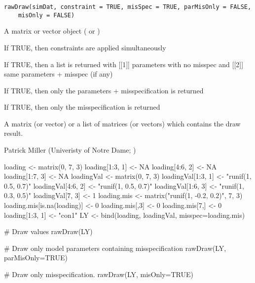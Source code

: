 \documentclass[a4paper]{book}
\begin{document}
%
\begin{Usage}
\begin{verbatim}
rawDraw(simDat, constraint = TRUE, misSpec = TRUE, parMisOnly = FALSE, 
    misOnly = FALSE)
\end{verbatim}
\end{Usage}
%
\begin{Arguments}
\begin{ldescription}
\item[\code{simDat}] 
A matrix or vector object ( or )

\item[\code{constraint}] 
If TRUE, then constraints are applied simultaneously

\item[\code{misSpec}] 
If TRUE, then a list is returned with [[1]] parameters with no misspec and [[2]] same parameters + misspec (if any)

\item[\code{parMisOnly}] 
If TRUE, then only the parameters + misspecification is returned

\item[\code{misOnly}] 
If TRUE, then only the misspecification is returned

\end{ldescription}
\end{Arguments}
%
\begin{Value}
A matrix (or vector) or a list of matrices (or vectors) which contains the draw result.
\end{Value}
%
\begin{Author}\relax
Patrick Miller (Univeristy of Notre Dame; )
\end{Author}
%
\begin{Examples}
\begin{ExampleCode}
loading <- matrix(0, 7, 3)
loading[1:3, 1] <- NA
loading[4:6, 2] <- NA
loading[1:7, 3] <- NA
loadingVal <- matrix(0, 7, 3)
loadingVal[1:3, 1] <- "runif(1, 0.5, 0.7)"
loadingVal[4:6, 2] <- "runif(1, 0.5, 0.7)"
loadingVal[1:6, 3] <- "runif(1, 0.3, 0.5)"
loadingVal[7, 3] <- 1
loading.mis <- matrix("runif(1, -0.2, 0.2)", 7, 3)
loading.mis[is.na(loading)] <- 0
loading.mis[,3] <- 0
loading.mis[7,] <- 0
loading[1:3, 1] <- "con1"
LY <- bind(loading, loadingVal, misspec=loading.mis)

# Draw values
rawDraw(LY)

# Draw only model parameters containing misspecification
rawDraw(LY, parMisOnly=TRUE)

# Draw only misspecification.
rawDraw(LY, misOnly=TRUE)
\end{ExampleCode}
\end{Examples}
\end{document}
